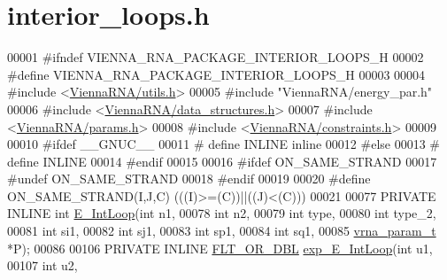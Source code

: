 \hypertarget{interior__loops_8h_source}{}\section{interior\+\_\+loops.\+h}
\label{interior__loops_8h_source}

\begin{DoxyCode}
00001 \textcolor{preprocessor}{#ifndef VIENNA\_RNA\_PACKAGE\_INTERIOR\_LOOPS\_H}
00002 \textcolor{preprocessor}{#define VIENNA\_RNA\_PACKAGE\_INTERIOR\_LOOPS\_H}
00003 
00004 \textcolor{preprocessor}{#include <\hyperlink{utils_8h}{ViennaRNA/utils.h}>}
00005 \textcolor{preprocessor}{#include "ViennaRNA/energy\_par.h"}
00006 \textcolor{preprocessor}{#include <\hyperlink{data__structures_8h}{ViennaRNA/data\_structures.h}>}
00007 \textcolor{preprocessor}{#include <\hyperlink{params_8h}{ViennaRNA/params.h}>}
00008 \textcolor{preprocessor}{#include <\hyperlink{constraints_8h}{ViennaRNA/constraints.h}>}
00009 
00010 \textcolor{preprocessor}{#ifdef \_\_GNUC\_\_}
00011 \textcolor{preprocessor}{# define INLINE inline}
00012 \textcolor{preprocessor}{#else}
00013 \textcolor{preprocessor}{# define INLINE}
00014 \textcolor{preprocessor}{#endif}
00015 
00016 \textcolor{preprocessor}{#ifdef ON\_SAME\_STRAND}
00017 \textcolor{preprocessor}{#undef ON\_SAME\_STRAND}
00018 \textcolor{preprocessor}{#endif}
00019 
00020 \textcolor{preprocessor}{#define ON\_SAME\_STRAND(I,J,C)  (((I)>=(C))||((J)<(C)))}
00021 
00077 PRIVATE INLINE \textcolor{keywordtype}{int} \hyperlink{group__loops_gaafbc187b7f78e8e82afb77dd6f3b8fc5}{E\_IntLoop}(\textcolor{keywordtype}{int} n1,
00078                               \textcolor{keywordtype}{int} n2,
00079                               \textcolor{keywordtype}{int} type,
00080                               \textcolor{keywordtype}{int} type\_2,
00081                               \textcolor{keywordtype}{int} si1,
00082                               \textcolor{keywordtype}{int} sj1,
00083                               \textcolor{keywordtype}{int} sp1,
00084                               \textcolor{keywordtype}{int} sq1,
00085                               \hyperlink{group__energy__parameters_structvrna__param__s}{vrna\_param\_t} *P);
00086 
00106 PRIVATE INLINE \hyperlink{group__data__structures_ga31125aeace516926bf7f251f759b6126}{FLT\_OR\_DBL} \hyperlink{group__loops_ga95de54d8a2a17645a95e0f34e189d9c9}{exp\_E\_IntLoop}(\textcolor{keywordtype}{int} u1,
00107                                         \textcolor{keywordtype}{int} u2,

\end{DoxyCode}
